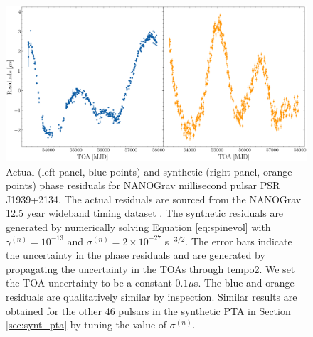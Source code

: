 \documentclass[fleqn,usenatbib,useAMS]{mnras}
\begin{document}
\begin{figure}
	\includegraphics[width=\columnwidth]{images/example_residuals_plot2}
	\caption{Actual (left panel, blue points) and synthetic (right panel, orange points) phase residuals for NANOGrav millisecond pulsar PSR J1939+2134. The actual residuals are sourced from the NANOGrav 12.5 year wideband timing dataset \citep{pennucci_timothy_t_2020_4312887,nanogravwideband}. The synthetic residuals are generated by numerically solving Equation \eqref{eq:spinevol} with $\gamma^{(n)} = 10^{-13}$ and $\sigma^{(n)} = 2\times 10^{-27}$ s$^{-3/2}$. The error bars indicate the uncertainty in the phase residuals and are generated by propagating the uncertainty in the TOAs through {\sc tempo2}. We set the TOA uncertainty to be a constant $0.1 \mu$s. The blue and orange residuals are qualitatively similar by inspection. Similar results are obtained for the other 46 pulsars in the synthetic PTA in Section \ref{sec:synt_pta} by tuning the value of $\sigma^{(n)}$.}
	\label{fig:qualitative_compare}
\end{figure}
\end{document}
